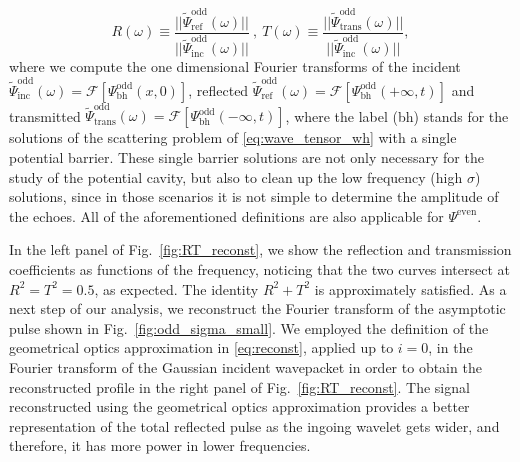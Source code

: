\documentclass[article,aps,nofootinbib,twocolumn,superscriptaddress]{revtex4-1}
\begin{document}
\begin{equation}
R(\omega)\equiv \frac{||\tilde{\Psi}_{\mathrm{ref}}^{\mathrm{odd}}(\omega)||}{||\tilde{\Psi}_{\mathrm{inc}}^{\mathrm{odd}}(\omega)||}~,~T(\omega)\equiv  \frac{||\tilde{\Psi}_{\mathrm{trans}}^{\mathrm{odd}}(\omega)||}{||\tilde{\Psi}_{\mathrm{inc}}^{\mathrm{odd}}(\omega)||},
\label{eq:odd_ref_and_trans}
\end{equation}
where we compute the one dimensional Fourier transforms of the incident $\tilde{\Psi}_{\mathrm{inc}}^{\mathrm{odd}}(\omega)=\mathcal{F}[\Psi^{\mathrm{odd}}_{\mathrm{bh}}(x,0)]$, reflected $\tilde{\Psi}_{\mathrm{ref}}^{\mathrm{odd}}(\omega)=\mathcal{F}[\Psi^{\mathrm{odd}}_{\mathrm{bh}}(+\infty,t)]$ and transmitted $\tilde{\Psi}_{\mathrm{trans}}^{\mathrm{odd}}(\omega)=\mathcal{F}[\Psi^{\mathrm{odd}}_{\mathrm{bh}}(-\infty,t)]$, where the label (bh) stands for the solutions of the scattering problem of \eqref{eq:wave_tensor_wh} with a single potential barrier. These single barrier solutions are not only necessary for the study of the potential cavity, but also to clean up the low frequency (high $\sigma$) solutions, since in those scenarios it is not simple to determine the amplitude of the echoes. All of the aforementioned definitions are also applicable for $\Psi^{\mathrm{even}}$. 


In the left panel of Fig.~\ref{fig:RT_reconst}, we show the reflection and transmission coefficients as functions of the frequency, noticing that the two curves intersect at $R^2=T^2=0.5$, as expected. The identity $R^2+T^2$ is approximately satisfied. As a next step of our analysis, we reconstruct the Fourier transform of the asymptotic pulse shown in Fig.~\ref{fig:odd_sigma_small}.  We employed the definition of the geometrical optics approximation in \eqref{eq:reconst}, applied up to $i=0$, in the Fourier transform of the Gaussian incident wavepacket in order to obtain the reconstructed profile in the right panel of Fig.~\ref{fig:RT_reconst}. The signal reconstructed using the geometrical optics approximation provides a better representation of the total reflected pulse as the ingoing wavelet gets wider, and therefore, it has more power in lower frequencies. 
\end{document}
